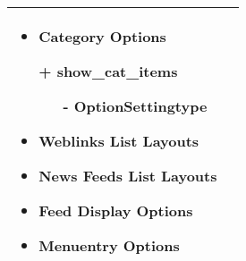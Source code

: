 \begin{minipage}{0.7\textwidth}
\begin{tabular}{|p{} | p{}|}
\begin{itemize}
\begin{enumerate}
\begin{enumerate}
	    	\end{enumerate}
	   \end{enumerate}
   	\item Category Options
   	\item[+] show\_cat\_items
   		    	  \begin{enumerate}
   		    			 \item[-] OptionSettingtype
   		    	\end{enumerate}
   	\item Weblinks List Layouts
   	\item News Feeds List Layouts
   	\item Feed Display Options
	\item Menuentry Options
 \end{itemize}
\\
\hline
\end{tabular}
\end{minipage}

